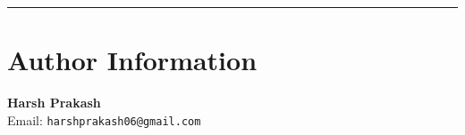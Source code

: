 \documentclass[a4paper,11pt]{article}
\begin{document}
\vspace{2em}
\begin{center}
\textcolor{headercolor}{\rule{\linewidth}{2pt}}
\end{center}

\section*{Author Information}
\begin{center}
\begin{tcolorbox}[colback=headercolor!10, colframe=headercolor, width=0.6\textwidth]
\centering
\textbf{\Large Harsh Prakash} \\
\vspace{0.5em}
Email: \texttt{harshprakash06@gmail.com}\newline
\date{\today}
\end{tcolorbox}
\end{center}
\end{document}
